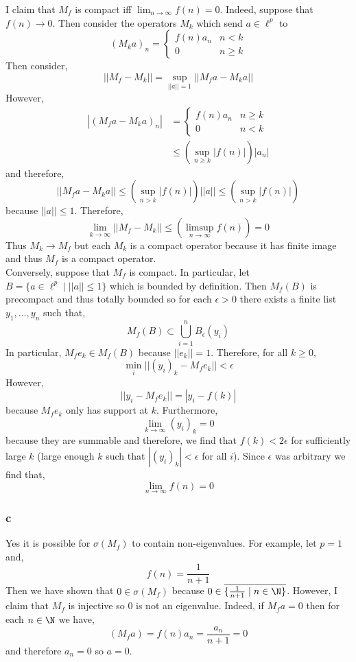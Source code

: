 \documentclass[12pt]{article}
\begin{document}
I claim that $M_f$ is compact iff $\lim_{n \to \infty} f(n) = 0$. Indeed, suppose that $f(n) \to 0$. Then consider the operators $M_k$ which send $a \in \ell^p$ to
\[ (M_k a)_n = \begin{cases}
f(n) a_n & n < k
\\
0 & n \ge k
\end{cases} \]
Then consider,
\[ || M_f - M_k || = \sup_{|| a || = 1} || M_f a - M_k a || \]
However, 
\begin{align*}
| (M_f a - M_k a)_n | & = 
\begin{cases}
f(n) a_n & n \ge k 
\\
0 & n < k
\end{cases} 
\\
& \le \left( \sup_{n \ge k} |f(n)| \right) |a_n| 
\end{align*}
and therefore,
\[ || M_f a - M_k a || \le \left( \sup_{n > k} |f(n)| \right) || a || \le \left( \sup_{n > k} |f(n)| \right) \]
because $|| a || \le 1$. Therefore,
\[ \lim_{k \to \infty} || M_f - M_k || \le \left( \limsup_{n \to \infty} f(n) \right) = 0 \]
Thus $M_k \to M_f$ but each $M_k$ is a compact operator because it has finite image and thus $M_f$ is a compact operator.
\bigskip\\
Conversely, suppose that $M_f$ is compact. In particular, let $B = \{ a \in \ell^p \mid || a || \le 1 \}$ which is bounded by definition. Then $M_f(B)$ is precompact and thus totally bounded so for each $\epsilon > 0$ there exists a finite list $y_1, \dots, y_n$ such that,
\[ M_f(B) \subset \bigcup_{i = 1}^n B_\epsilon(y_i) \]
In particular, $M_f e_k \in M_f(B)$ because $|| e_k || = 1$. Therefore, for all $k \ge 0$,
\[ \min_{i} || (y_i)_k - M_f e_k || < \epsilon \]
However,
\[ || y_i - M_f e_k || = |y_i - f(k)| \]
because $M_f e_k$ only has support at $k$. Furthermore, 
\[ \lim_{k \to \infty} (y_i)_k = 0 \]
because they are summable and therefore, we find that $f(k) < 2 \epsilon$ for sufficiently large $k$ (large enough $k$ such that $|(y_i)_k| < \epsilon$ for all $i$). Since $\epsilon$ was arbitrary we find that,
\[ \lim_{n \to \infty} f(n) = 0 \]

\subsubsection{c}

Yes it is possible for $\sigma(M_f)$ to contain non-eigenvalues. For example, let $p = 1$ and,
\[ f(n) = \frac{1}{n+1} \]
Then we have shown that $0 \in \sigma(M_f)$ because $0 \in \overline{ \{\tfrac{1}{n+1} \mid n \in \N \}}$. However, I claim that $M_f$ is injective so $0$ is not an eigenvalue. Indeed, if $M_f a = 0$ then for each $n \in \N$ we have,
\[ (M_f a) = f(n) a_n = \frac{a_n}{n+1} = 0 \]
and therefore $a_n = 0$ so $a = 0$. 
\end{document}

